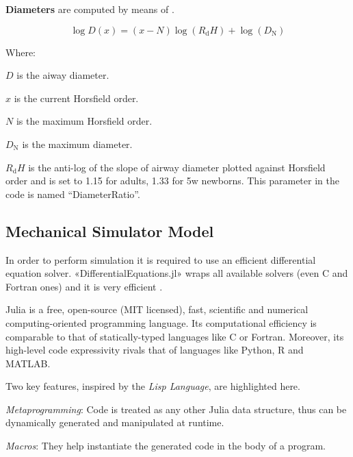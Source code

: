 
\textbf{Diameters} are computed by means of .

\begin{equation}
  \log D(x) = (x - N)\log(R_{\text{d}} H) + \log(D_{\text{N}})
  \label{eq:lumen_diameter}
\end{equation}

Where:
\begin{description}
\item $D$ is the aiway diameter.
\item $x$ is the current Horsfield order.
\item $N$ is the maximum Horsfield order.
\item $D_{\text{N}}$ is the maximum diameter.
\item $R_{\text{d}} H$ is the anti-log of the slope of airway diameter
  plotted against Horsfield order and is set to 1.15 for adults, 1.33
  for 5w newborns\cite[][Tab. 2]{horsfield1987}.  This parameter in
  the code is named ``DiameterRatio''.
\end{description}
  
\subsection{Mechanical Simulator Model}
\label{subsec:simulator_development}

In order to perform simulation it is required to use an efficient
differential equation solver.  «DifferentialEquations.jl» wraps all
available solvers (even C and Fortran ones) and it is very efficient
\cite{diffeqdocs2024,rackauckas2017}.

Julia is a free, open-source (MIT licensed), fast, scientific and
numerical computing-oriented programming language.  Its computational
efficiency is comparable to that of statically-typed languages like C
or Fortran.  Moreover, its high-level code expressivity rivals that of
languages like Python, R and MATLAB\cite{juliadocs2024}.

Two key features, inspired by the \emph{Lisp Language}, are
highlighted here.

\begin{description}
\item \emph{Metaprogramming}: Code is treated as any other Julia data
  structure, thus can be dynamically generated and manipulated at
  runtime.
\item \emph{Macros}: They help instantiate the generated code in the
  body of a program.
\end{description}

